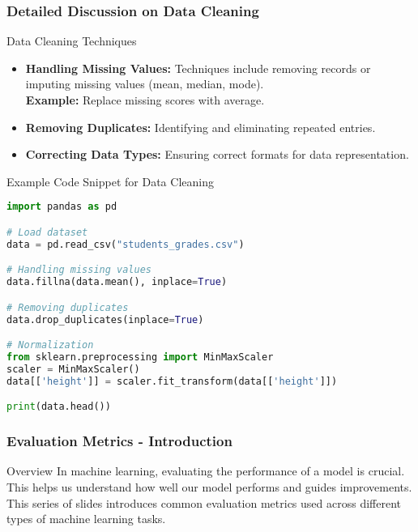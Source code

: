 \documentclass[aspectratio=169]{beamer}
\begin{document}
\begin{frame}[fragile]
    \frametitle{Detailed Discussion on Data Cleaning}
    \begin{block}{Data Cleaning Techniques}
        \begin{itemize}
            \item \textbf{Handling Missing Values:}
            Techniques include removing records or imputing missing values (mean, median, mode).\\
            \textbf{Example:} Replace missing scores with average.
            \item \textbf{Removing Duplicates:}
            Identifying and eliminating repeated entries.
            \item \textbf{Correcting Data Types:}
            Ensuring correct formats for data representation.
        \end{itemize}
    \end{block}
\end{frame}

\begin{frame}[fragile]{Example Code Snippet for Data Cleaning}
    \begin{lstlisting}[language=Python]
import pandas as pd

# Load dataset
data = pd.read_csv("students_grades.csv")

# Handling missing values
data.fillna(data.mean(), inplace=True)

# Removing duplicates
data.drop_duplicates(inplace=True)

# Normalization
from sklearn.preprocessing import MinMaxScaler
scaler = MinMaxScaler()
data[['height']] = scaler.fit_transform(data[['height']])

print(data.head())
    \end{lstlisting}
\end{frame}

\begin{frame}[fragile]
    \frametitle{Evaluation Metrics - Introduction}
    \begin{block}{Overview}
        In machine learning, evaluating the performance of a model is crucial. 
        This helps us understand how well our model performs and guides improvements.
        This series of slides introduces common evaluation metrics used across different types of machine learning tasks.
    \end{block}
\end{frame}
\end{document}
